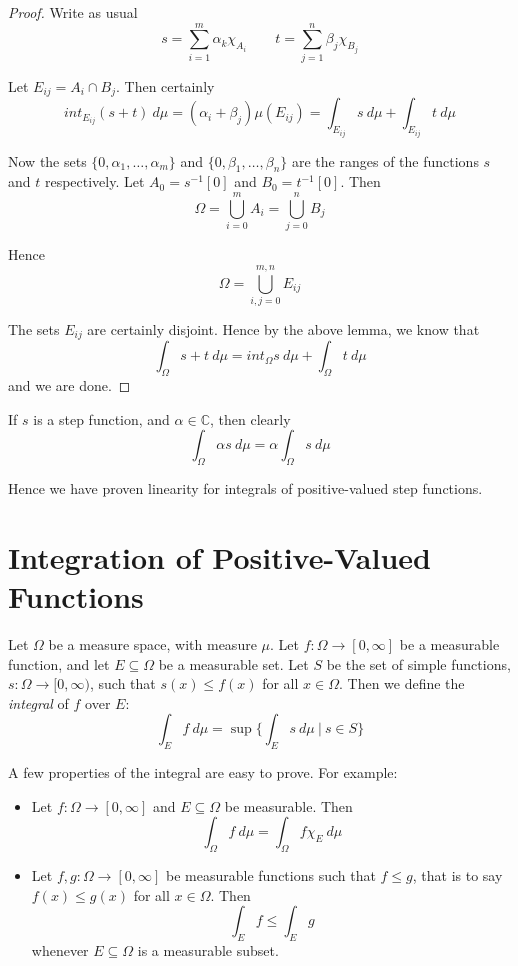 \begin{proof}
Write as usual
$$s = \sum_{i=1}^m \alpha_k \chi_{A_i} \qquad t = \sum_{j=1}^n \beta_j \chi_{B_j}$$

Let $E_{ij} = A_i \cap B_j$.  Then certainly
$$int_{E_{ij}} (s+t)\ d\mu = (\alpha_i +\beta_j)\mu (E_{ij}) = \int_{E_{ij}}s\ d\mu + \int_{E_{ij}}t\ d\mu$$

Now the sets $\{ 0, \alpha_1 , \ldots , \alpha_m \}$ and $\{ 0, \beta_1 , \ldots ,\beta_n \}$ are the ranges of the functions $s$ and $t$ respectively.  Let $A_0 = s^{-1}[0]$ and $B_0 = t^{-1}[0]$.  Then
$$\Omega = \bigcup_{i=0}^m A_i = \bigcup_{j=0}^n B_j$$

Hence
$$\Omega = \bigcup_{i,j=0}^{m,n}E_{ij}$$

The sets $E_{ij}$ are certainly disjoint.  Hence by the above lemma, we know that
$$\int_\Omega s+t \ d\mu = int_\Omega s\ d\mu + \int_\Omega t\ d\mu$$
and we are done.
\end{proof}

If $s$ is a step function, and $\alpha \in {\mathbb C}$, then clearly
$$\int_\Omega \alpha s\ d\mu = \alpha \int_\Omega s\ d\mu$$

Hence we have proven linearity for integrals of positive-valued step functions.

\section{Integration of Positive-Valued Functions}

\begin{definition}
Let $\Omega$ be a measure space, with measure $\mu$.  Let $f\colon \Omega \rightarrow [0,\infty ]$ be a measurable function, and let $E\subseteq \Omega$ be a measurable set.  Let $S$ be the set of simple functions, $s\colon \Omega \rightarrow [0,\infty )$, such that $s(x) \leq f(x)$ for all $x\in \Omega$.  Then we define the {\em integral} of $f$ over $E$:
$$\int_E f\ d\mu = \sup \{ \int_E s\ d\mu \ |\ s\in S \}$$
\end{definition}

A few properties of the integral are easy to prove.  For example:

\begin{itemize}

\item Let $f\colon \Omega \rightarrow [0,\infty ]$ and $E\subseteq \Omega$ be measurable.  Then
$$\int_\Omega f\ d\mu = \int_\Omega f\chi_E\ d\mu$$


\item Let $f,g\colon \Omega \rightarrow [0,\infty ]$ be measurable functions such that $f\leq g$, that is to say $f(x)\leq g(x)$ for all $x\in \Omega$.  Then
$$\int_E f \leq \int_E g$$
whenever $E\subseteq \Omega$ is a measurable subset.

\end{itemize}

